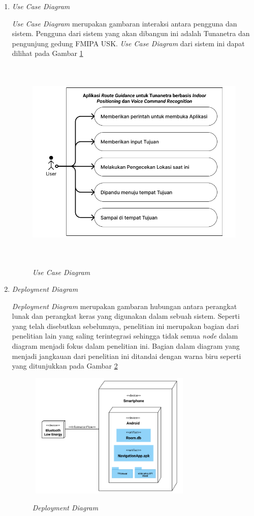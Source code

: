 \begin{enumerate}
\item \textit{Use Case Diagram}
\par \textit{Use Case Diagram} merupakan gambaran interaksi antara pengguna dan sistem. Pengguna dari sistem yang akan dibangun ini adalah Tunanetra dan pengunjung gedung FMIPA USK. \textit{Use Case Diagram} dari sistem ini dapat dilihat pada Gambar \ref{img:use_case_diagram}

\begin{figure}[H]
\centering
{\includegraphics [width = 12cm, height= 10cm]{gambar/bab3/use_case_diagram}}
\caption{\textit{Use Case Diagram}}
\label{img:use_case_diagram}
\end{figure}

\newpage
\item \textit{Deployment Diagram}
\par \textit{Deployment Diagram} merupakan gambaran hubungan antara perangkat lunak dan perangkat keras yang digunakan dalam sebuah sistem. Seperti yang telah disebutkan sebelumnya, penelitian ini merupakan bagian dari penelitian lain yang saling terintegrasi sehingga tidak semua \textit{node} dalam diagram menjadi fokus dalam penelitian ini. Bagian dalam diagram yang menjadi jangkauan dari penelitian ini ditandai dengan warna biru seperti yang ditunjukkan pada Gambar \ref{img:deployment_diagram}

\begin{figure}[H]
\centering
{\includegraphics [width = 8cm, height= 6cm]{gambar/bab3/deployment_diagram}}
\caption{\textit{Deployment Diagram}}
\label{img:deployment_diagram}
\end{figure}


\end{enumerate}
